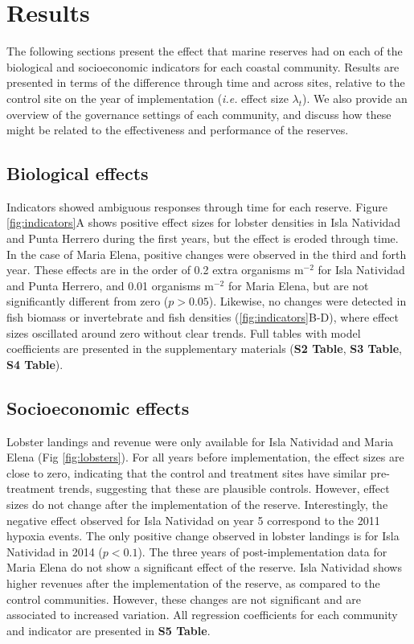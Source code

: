 \documentclass{frontiersSCNS}
\theoremstyle{definition}
\theoremstyle{definition}
\theoremstyle{definition}
\theoremstyle{remark}
\begin{document}
\section{Results}\label{results}

The following sections present the effect that marine reserves had on
each of the biological and socioeconomic indicators for each coastal
community. Results are presented in terms of the difference through time
and across sites, relative to the control site on the year of
implementation (\emph{i.e.} effect size \(\lambda_t\)). We also provide
an overview of the governance settings of each community, and discuss
how these might be related to the effectiveness and performance of the
reserves.

\subsection{Biological effects}\label{biological-effects}

Indicators showed ambiguous responses through time for each reserve.
Figure \ref{fig:indicators}A shows positive effect sizes for lobster
densities in Isla Natividad and Punta Herrero during the first years,
but the effect is eroded through time. In the case of Maria Elena,
positive changes were observed in the third and forth year. These
effects are in the order of 0.2 extra organisms \(\mathrm{m}^{-2}\) for
Isla Natividad and Punta Herrero, and 0.01 organisms \(\mathrm{m}^{-2}\)
for Maria Elena, but are not significantly different from zero
(\(p > 0.05\)). Likewise, no changes were detected in fish biomass or
invertebrate and fish densities (\ref{fig:indicators}B-D), where effect
sizes oscillated around zero without clear trends. Full tables with
model coefficients are presented in the supplementary materials
(\textbf{S2 Table}, \textbf{S3 Table}, \textbf{S4 Table}).

\subsection{Socioeconomic effects}\label{socioeconomic-effects}

Lobster landings and revenue were only available for Isla Natividad and
Maria Elena (Fig \ref{fig:lobsters}). For all years before
implementation, the effect sizes are close to zero, indicating that the
control and treatment sites have similar pre-treatment trends,
suggesting that these are plausible controls. However, effect sizes do
not change after the implementation of the reserve. Interestingly, the
negative effect observed for Isla Natividad on year 5 correspond to the
2011 hypoxia events. The only positive change observed in lobster
landings is for Isla Natividad in 2014 (\(p < 0.1\)). The three years of
post-implementation data for Maria Elena do not show a significant
effect of the reserve. Isla Natividad shows higher revenues after the
implementation of the reserve, as compared to the control communities.
However, these changes are not significant and are associated to
increased variation. All regression coefficients for each community and
indicator are presented in \textbf{S5 Table}.
\end{document}
